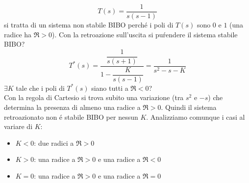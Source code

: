 \documentclass[../main.tex]{subfiles}
\begin{document}
		\begin{Exercise}[title={Studiare stabilit\'a BIBO dopo retroazione sull'uscita}, difficulty=1]
			\[
				T(s) = \dfrac{1}{s(s-1)}
			\]
			si tratta di un sistema non stabile BIBO perch\'e i poli di $ T(s) $ sono $ 0 $ e $ 1 $ (una radice ha $ \Re > 0 $). Con la retroazione sull'uscita si pu\' rendere il sistema stabile BIBO?
			\[
				T^{*}(s) = \dfrac{\dfrac{1}{s(s+1)}}{1-\dfrac{K}{s(s-1)}} = \dfrac{1}{s^2-s-K}
			\]
			$ \exists K $ tale che i poli di $ T^{*}(s) $ siano tutti a $ \Re < 0 $?\\
			Con la regola di Cartesio si trova subito una variazione (tra $ s^2 $ e $ -s $) che determina la presenza di almeno una radice a $ \Re > 0 $. Quindi il sistema retroazionato non \'e stabile BIBO per nessun $ K $. Analizziamo comunque i casi al variare di $ K $:
			\begin{itemize}
				\item $ K < 0 $: due radici a $ \Re > 0 $
				\item $ K > 0 $: una radice a $ \Re > 0 $ e una radice a $ \Re < 0 $
				\item $ K = 0 $: una radice a $ \Re > 0 $ e una radice a $ \Re = 0 $
			\end{itemize}
		\end{Exercise}
\end{document}
